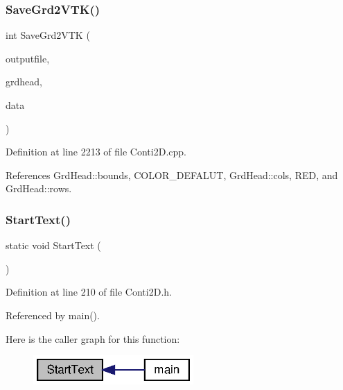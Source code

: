 \subsubsection{Save\+Grd2\+V\+T\+K()}
{\footnotesize\ttfamily int Save\+Grd2\+V\+TK (\begin{DoxyParamCaption}\item[{string}]{outputfile,  }\item[{\textbf{ Grd\+Head}}]{grdhead,  }\item[{double $\ast$}]{data }\end{DoxyParamCaption})}



Definition at line 2213 of file Conti2\+D.\+cpp.



References Grd\+Head\+::bounds, C\+O\+L\+O\+R\+\_\+\+D\+E\+F\+A\+L\+UT, Grd\+Head\+::cols, R\+ED, and Grd\+Head\+::rows.

\mbox{\label{Conti2D_8h_af1fa497bd2e5d983e49f2401e3470c92_af1fa497bd2e5d983e49f2401e3470c92}} 
\subsubsection{Start\+Text()}
{\footnotesize\ttfamily static void Start\+Text (\begin{DoxyParamCaption}{ }\end{DoxyParamCaption})\hspace{0.3cm}{\ttfamily [static]}}



Definition at line 210 of file Conti2\+D.\+h.



Referenced by main().

Here is the caller graph for this function\+:\nopagebreak
\begin{figure}[H]
\begin{center}
\leavevmode
\includegraphics[width=173pt]{Conti2D_8h_af1fa497bd2e5d983e49f2401e3470c92_af1fa497bd2e5d983e49f2401e3470c92_icgraph}
\end{center}
\end{figure}
\mbox{\label{Conti2D_8h_a45d91f9b0b8852118211734681191355_a45d91f9b0b8852118211734681191355}} 
